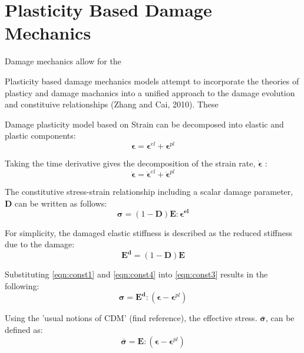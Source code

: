 \section{Plasticity Based Damage Mechanics}

Damage mechanics allow for the 

Plasticity based damage mechanics models attempt to incorporate the
theories of plasticy and damage machanics into a unified approach
to the damage evolution and constituive relationships (Zhang and Cai,
2010). These 

Damage plasticity model based on Strain can be decomposed into elastic
and plastic components: 
\begin{equation}
\boldsymbol{\epsilon}=\boldsymbol{\epsilon}^{el}+\boldsymbol{\epsilon}^{pl}\label{eqn:const1}
\end{equation}


Taking the time derivative gives the decomposition of the strain rate,
$\boldsymbol{\dot{\epsilon}}$ : 
\begin{equation}
\boldsymbol{\dot{\epsilon}}=\boldsymbol{\dot{\epsilon}}^{el}+\boldsymbol{\dot{\epsilon}}^{pl}\label{eqn:const2}
\end{equation}


The constitutive stress-strain relationship including a scalar damage
parameter, $\mathbf{D}$ can be written as follows: 
\begin{equation}
\boldsymbol{\sigma}=(1-\mathbf{D})\mathbf{E}:\boldsymbol{\epsilon^{el}}\label{eqn:const3}
\end{equation}


For simplicity, the damaged elastic stiffness is described as the
reduced stiffness due to the damage: 
\begin{equation}
\mathbf{E^{d}}=(1-\mathbf{D})\mathbf{E}\label{eqn:const4}
\end{equation}


Substituting \ref{eqn:const1} and \ref{eqn:const4} into \ref{eqn:const3}
results in the following: 
\begin{equation}
\boldsymbol{\sigma}=\mathbf{E^{d}}:(\boldsymbol{\epsilon}-\boldsymbol{\epsilon}^{pl})\label{eqn:const5}
\end{equation}


Using the 'usual notions of CDM' (find
reference), the effective stress. $\boldsymbol{\bar{\sigma}}$, can
be defined as: 
\begin{equation}
\boldsymbol{\bar{\sigma}}=\mathbf{E}:(\boldsymbol{\epsilon}-\boldsymbol{\epsilon}^{pl})\label{eqn:const6}
\end{equation}


